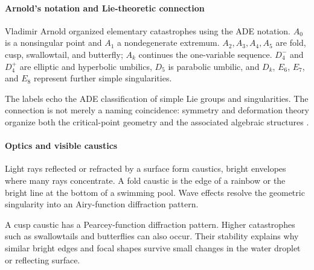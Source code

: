 \paragraph{Arnold's notation and Lie-theoretic connection}

Vladimir Arnold organized elementary catastrophes using the ADE notation. $A_0$ is a nonsingular point and $A_1$ a nondegenerate extremum. $A_2,A_3,A_4,A_5$ are fold, cusp, swallowtail, and butterfly; $A_k$ continues the one-variable sequence. $D_4^-$ and $D_4^+$ are elliptic and hyperbolic umbilics, $D_5$ is parabolic umbilic, and $D_k$, $E_6$, $E_7$, and $E_8$ represent further simple singularities.

The labels echo the ADE classification of simple Lie groups and singularities. The connection is not merely a naming coincidence: symmetry and deformation theory organize both the critical-point geometry and the associated algebraic structures \cite{catastrophe_theory_ref4}.

\paragraph{Optics and visible caustics}

Light rays reflected or refracted by a surface form caustics, bright envelopes where many rays concentrate. A fold caustic is the edge of a rainbow or the bright line at the bottom of a swimming pool. Wave effects resolve the geometric singularity into an Airy-function diffraction pattern.

A cusp caustic has a Pearcey-function diffraction pattern. Higher catastrophes such as swallowtails and butterflies can also occur. Their stability explains why similar bright edges and focal shapes survive small changes in the water droplet or reflecting surface.


